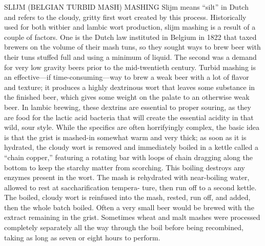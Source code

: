\documentclass[a4paper,parskip=half]{scrartcl}
\begin{document}
\parencite[139]{Mosher2015}
SLIJM (BELGIAN TURBID MASH) MASHING
Slijm means “silt” in Dutch and refers to the cloudy, gritty ﬁrst
wort created by this process. Historically used for both witbier
and lambic wort production, slijm mashing is a result of a couple
of factors. One is the Dutch law instituted in Belgium in 1822
that taxed brewers on the volume of their mash tuns, so they
sought ways to brew beer with their tuns stuffed full and using
a minimum of liquid. The second was a demand for very low
gravity beers prior to the mid-twentieth century. Turbid mashing
is an effective—if time-consuming—way to brew a weak beer
with a lot of ﬂavor and texture; it produces a highly dextrinous
wort that leaves some substance in the ﬁnished beer, which gives
some weight on the palate to an otherwise weak beer. In lambic
brewing, these dextrins are essential to proper souring, as they
are food for the lactic acid bacteria that will create the essential
acidity in that wild, sour style.
While the speciﬁcs are often horrifyingly complex, the basic
idea is that the grist is mashed-in somewhat warm and very
thick; as soon as it is hydrated, the cloudy wort is removed and
immediately boiled in a kettle called a “chain copper,” featuring
a rotating bar with loops of chain dragging along the bottom to
keep the starchy matter from scorching. This boiling destroys
any enzymes present in the wort. The mash is rehydrated with
near-boiling water, allowed to rest at sacchariﬁcation tempera-
ture, then run off to a second kettle. The boiled, cloudy wort
is reinfused into the mash, rested, run off, and added, then the
whole batch boiled. Often a very small beer would be brewed
with the extract remaining in the grist. Sometimes wheat and
malt mashes were processed completely separately all the way
through the boil before being recombined, taking as long as seven
or eight hours to perform.
\end{document}
